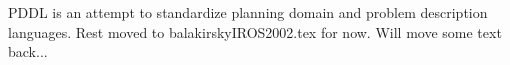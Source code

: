 PDDL is an attempt to standardize planning domain and problem description languages. Rest moved to balakirskyIROS2002.tex for now. Will move some text back...


\begin{comment}
\begin{enumerate}
\item \textsl{take-kt} ($\mathrm{r}$, $\mathrm{kt}$, $\mathrm{lbwekt}$, $\mathrm{eeff}$)
\begin{itemize}
\item ;;The robot $\mathrm{r}$ is equipped with the end effector $\mathrm{eeff}$ to pick up the kit tray $\mathrm{kt}$ from the large box with empty kit trays $\mathrm{lbwekt}$.
\item precond:
\begin{itemize}
\item[]\emph{ktloc}$\mathrm{(kt)=lbwekt}$
\item[]\emph{rhold}$\mathrm{(r)=nil}$
\item[]\emph{rgrip}$\mathrm{(r)=eeff}$
\item[]\emph{islbwektempty}$\mathrm{(kt)=0}$
\item[]\emph{geffloc}$\mathrm{(eeff)=r}$
\end{itemize}
\item effects:
\begin{itemize}
\item[]\emph{ktloc}$\mathrm{(kt)\leftarrow r}$
\item[]\emph{rhold}$\mathrm{(r)\leftarrow kt}$
\end{itemize}
\end{itemize}

\item \textsl{put-kt} ($\mathrm{r}$, $\mathrm{kt}$, $\mathrm{wtable}$)
\begin{itemize}
\item ;;The robot $\mathrm{r}$ puts down the kit tray $\mathrm{kt}$ on the work table $\mathrm{wtable}$.
\item precond:
\begin{itemize}
\item[]\emph{ktloc}$\mathrm{(kt)=r}$
\item[]\emph{rhold}$\mathrm{(r)=kt}$
\item[]\emph{topworktable}$\mathrm{(wtable)=nil}$
\end{itemize}
\item effects:
\begin{itemize}
\item[]\emph{ktloc}$\mathrm{(kt)\leftarrow wtable}$
\item[]\emph{rhold}$\mathrm{(r)\leftarrow nil}$
\item[]\emph{topworktable}$\mathrm{(r)\leftarrow kt}$
\end{itemize}
\end{itemize}


\end{comment}
